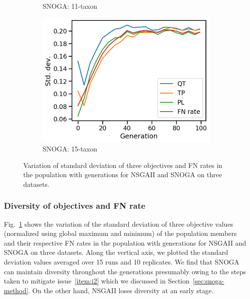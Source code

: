 \begin{figure}[!htbp]
\begin{subfigure}[b]{0.33\textwidth}
			\caption{SNOGA: 11-taxon}
\end{subfigure}\begin{subfigure}[b]{0.33\textwidth}
			\includegraphics[width=\textwidth]{Figure/15-taxon_NOSSGA_std_dev}
			\caption{SNOGA: 15-taxon}
\end{subfigure}
		\caption{Variation of standard deviation of three objectives and FN rates in the population with generations for NSGAII and SNOGA on three datasets.}
		\label{fig:gen_wise_std_dev}
\end{figure}

\subsubsection{Diversity of objectives and FN rate}\label{subsubsec:diversity} Fig.~\ref{fig:gen_wise_std_dev} shows the variation of the standard deviation of three objective values (normalized using global maximum and minimum) of the population members and their respective FN rates in the population with generations for NSGAII and SNOGA on three datasets. Along the vertical axis, we plotted the standard deviation values averaged over 15 runs and 10 replicates. We find that SNOGA can maintain diversity throughout the generations presumably owing to the steps taken to mitigate issue~\ref{item:i2} which we discussed in Section~\ref{sec:snoga-method}. On the other hand, NSGAII loses diversity at an early stage.


